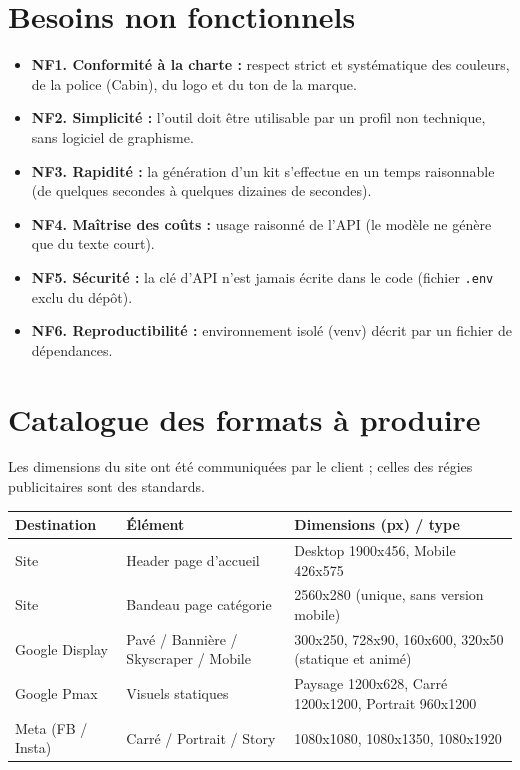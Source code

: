 \documentclass[11pt,a4paper]{article}
\begin{document}
\section{Besoins non fonctionnels}
\begin{itemize}[leftmargin=1.4em]
  \item \textbf{NF1. Conformité à la charte :} respect strict et systématique
        des couleurs, de la police (Cabin), du logo et du ton de la marque.
  \item \textbf{NF2. Simplicité :} l'outil doit être utilisable par un profil non
        technique, sans logiciel de graphisme.
  \item \textbf{NF3. Rapidité :} la génération d'un kit s'effectue en un temps
        raisonnable (de quelques secondes à quelques dizaines de secondes).
  \item \textbf{NF4. Maîtrise des coûts :} usage raisonné de l'API (le modèle ne
        génère que du texte court).
  \item \textbf{NF5. Sécurité :} la clé d'API n'est jamais écrite dans le code
        (fichier \texttt{.env} exclu du dépôt).
  \item \textbf{NF6. Reproductibilité :} environnement isolé (venv) décrit par un
        fichier de dépendances.
\end{itemize}

\section{Catalogue des formats à produire}
Les dimensions du site ont été communiquées par le client ; celles des régies
publicitaires sont des standards.

\begin{center}\small
\begin{tabular}{@{}>{\raggedright\arraybackslash}p{3.0cm} >{\raggedright\arraybackslash}p{4.3cm} >{\raggedright\arraybackslash}p{4.5cm}@{}}
\toprule
\textbf{Destination} & \textbf{Élément} & \textbf{Dimensions (px) / type} \\
\midrule
Site & Header page d'accueil & Desktop 1900x456, Mobile 426x575 \\
Site & Bandeau page catégorie & 2560x280 (unique, sans version mobile) \\
Google Display & Pavé / Bannière / Skyscraper / Mobile & 300x250, 728x90, 160x600, 320x50 (statique et animé) \\
Google Pmax & Visuels statiques & Paysage 1200x628, Carré 1200x1200, Portrait 960x1200 \\
Meta (FB / Insta) & Carré / Portrait / Story & 1080x1080, 1080x1350, 1080x1920 \\
\bottomrule
\end{tabular}
\end{center}
\end{document}
